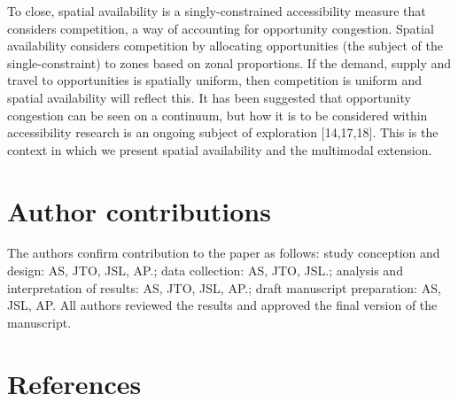 \documentclass[10pt,letterpaper]{article}
\begin{document}
To close, spatial availability is a singly-constrained accessibility
measure that considers competition, a way of accounting for opportunity
congestion. Spatial availability considers competition by allocating
opportunities (the subject of the single-constraint) to zones based on
zonal proportions. If the demand, supply and travel to opportunities is
spatially uniform, then competition is uniform and spatial availability
will reflect this. It has been suggested that opportunity congestion can
be seen on a continuum, but how it is to be considered within
accessibility research is an ongoing subject of exploration
{[}14,17,18{]}. This is the context in which we present spatial
availability and the multimodal extension.

\hypertarget{author-contributions}{%
\section{Author contributions}\label{author-contributions}}

The authors confirm contribution to the paper as follows: study
conception and design: AS, JTO, JSL, AP.; data collection: AS, JTO,
JSL.; analysis and interpretation of results: AS, JTO, JSL, AP.; draft
manuscript preparation: AS, JSL, AP. All authors reviewed the results
and approved the final version of the manuscript.

\hypertarget{references}{%
\section*{References}\label{references}}
\end{document}
